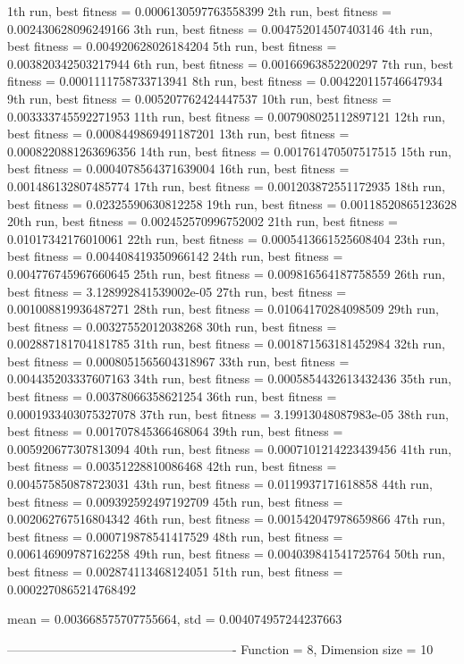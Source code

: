 1th run, best fitness = 0.0006130597763558399
2th run, best fitness = 0.002430628096249166
3th run, best fitness = 0.004752014507403146
4th run, best fitness = 0.004920628026184204
5th run, best fitness = 0.003820342503217944
6th run, best fitness = 0.00166963852200297
7th run, best fitness = 0.0001111758733713941
8th run, best fitness = 0.004220115746647934
9th run, best fitness = 0.005207762424447537
10th run, best fitness = 0.003333745592271953
11th run, best fitness = 0.007908025112897121
12th run, best fitness = 0.0008449869491187201
13th run, best fitness = 0.0008220881263696356
14th run, best fitness = 0.001761470507517515
15th run, best fitness = 0.0004078564371639004
16th run, best fitness = 0.001486132807485774
17th run, best fitness = 0.001203872551172935
18th run, best fitness = 0.02325590630812258
19th run, best fitness = 0.00118520865123628
20th run, best fitness = 0.002452570996752002
21th run, best fitness = 0.01017342176010061
22th run, best fitness = 0.0005413661525608404
23th run, best fitness = 0.004408419350966142
24th run, best fitness = 0.004776745967660645
25th run, best fitness = 0.009816564187758559
26th run, best fitness = 3.128992841539002e-05
27th run, best fitness = 0.001008819936487271
28th run, best fitness = 0.01064170284098509
29th run, best fitness = 0.00327552012038268
30th run, best fitness = 0.002887181704181785
31th run, best fitness = 0.001871563181452984
32th run, best fitness = 0.0008051565604318967
33th run, best fitness = 0.004435203337607163
34th run, best fitness = 0.0005854432613432436
35th run, best fitness = 0.00378066358621254
36th run, best fitness = 0.0001933403075327078
37th run, best fitness = 3.19913048087983e-05
38th run, best fitness = 0.001707845366468064
39th run, best fitness = 0.005920677307813094
40th run, best fitness = 0.0007101214223439456
41th run, best fitness = 0.00351228810086468
42th run, best fitness = 0.004575850878723031
43th run, best fitness = 0.0119937171618858
44th run, best fitness = 0.009392592497192709
45th run, best fitness = 0.002062767516804342
46th run, best fitness = 0.001542047978659866
47th run, best fitness = 0.000719878541417529
48th run, best fitness = 0.006146909787162258
49th run, best fitness = 0.004039841541725764
50th run, best fitness = 0.002874113468124051
51th run, best fitness = 0.0002270865214768492

mean = 0.003668575707755664, std = 0.004074957244237663

-------------------------------------------------------
Function = 8, Dimension size = 10

